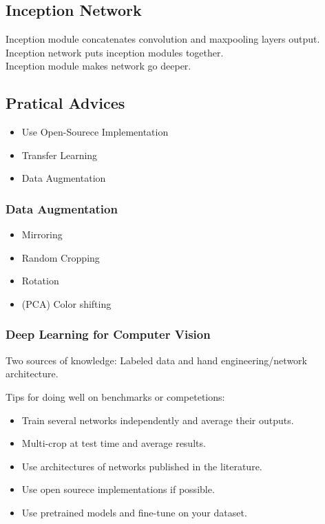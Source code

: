 \documentclass{article}
\begin{document}
	\subsection{Inception Network}
	\begin{flushleft}
		Inception module concatenates convolution and maxpooling layers output. Inception network puts inception modules together.\\
		Inception module makes network go deeper.
	\end{flushleft}
	\subsection{Pratical Advices}
	\begin{itemize}
		\item Use Open-Sourece Implementation
		\item Transfer Learning
		\item Data Augmentation
	\end{itemize}
	\subsubsection{Data Augmentation}
	\begin{itemize}
		\item Mirroring
		\item Random Cropping
		\item Rotation
		\item (PCA) Color shifting
	\end{itemize}
	\subsubsection{Deep Learning for Computer Vision}
	\begin{flushleft}
		Two sources of knowledge: Labeled data and hand engineering/network architecture.
	\end{flushleft}
	\begin{flushleft}
		Tips for doing well on benchmarks or competetions:
		\begin{itemize}
			\item Train several networks independently and average their outputs.
			\item Multi-crop at test time and average results.
			\item Use architectures of networks published in the literature.
			\item Use open sourece implementations if possible.
			\item Use pretrained models and fine-tune on your dataset.
		\end{itemize}
	\end{flushleft}
	
\end{document}
